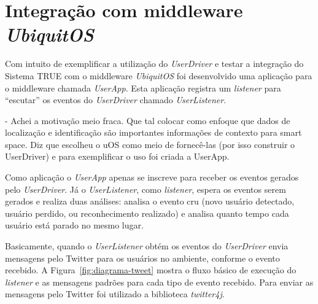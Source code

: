 \section{Integração com middleware \textit{UbiquitOS}}

	Com intuito de exemplificar a utilização do \textit{UserDriver} e testar a integração do Sistema TRUE com o middleware \textit{UbiquitOS} foi desenvolvido uma aplicação para o middleware chamada \textit{UserApp}. Esta aplicação registra um \textit{listener} para ``escutar'' os eventos do \textit{UserDriver} chamado \textit{UserListener}. 


	- Achei a motivação meio fraca. Que tal colocar como enfoque que dados de localização e identificação são importantes informações de contexto para smart space. Diz que escolheu o uOS como meio de fornecê-las (por isso construir o UserDriver) e para exemplificar o uso foi criada a UserApp.

	Como aplicação o \textit{UserApp} apenas se inscreve para receber os eventos gerados pelo \textit{UserDriver}. Já o \textit{UserListener}, como \textit{listener}, espera os eventos serem gerados e realiza duas análises: analisa o evento cru (novo usuário detectado, usuário perdido, ou reconhecimento realizado) e analisa quanto tempo cada usuário está parado no mesmo lugar.



	Basicamente, quando o \textit{UserListener} obtém os eventos do \textit{UserDriver} envia mensagens pelo Twitter para os usuários no ambiente, conforme o evento recebido. A Figura~\ref{fig:diagrama-tweet} mostra o fluxo básico de execução do \textit{listener} e as mensagens padrões para cada tipo de evento recebido. Para enviar as mensagens pelo Twitter foi utilizado a biblioteca \textit{twitter4j}. 

